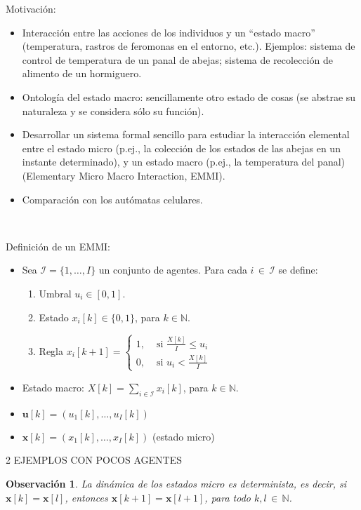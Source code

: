 \documentclass{article}
\newtheorem{obs}{Observación}
\begin{document}
Motivación: 
\begin{itemize}
\item Interacción entre las acciones de los individuos y un ``estado macro'' (temperatura, rastros de feromonas en el entorno, etc.). Ejemplos: sistema de control de temperatura de un panal de abejas; sistema de recolección de alimento de un hormiguero.
\item Ontología del estado macro: sencillamente otro estado de cosas (se abstrae su naturaleza y se considera sólo su función).
\item Desarrollar un sistema formal sencillo para  estudiar la interacción elemental entre el estado micro (p.ej., la colección de los estados de las abejas en un instante determinado), y un estado macro (p.ej., la temperatura del panal) (Elementary Micro Macro Interaction, EMMI). 
\item Comparación con los autómatas celulares.
\end{itemize}

\

Definición de un EMMI:
\begin{itemize}
\item Sea $\mathcal{I}=\{1,\ldots,I\}$ un conjunto de agentes. Para cada $i\,{\in}\,\mathcal{I}$ se define:
	\begin{enumerate}[label=(\alph*)]
	\item Umbral $u_i\in[0,1]$.
	\item Estado $x_i[k]\in\{0, 1\}$, para $k\in\mathbb{N}$.
	\item Regla  $x_i[k+1]=\begin{cases} 1, & \mbox{ si }\frac{X[k]}{I}\leq u_i\\ 0, & \mbox{ si } u_i < \frac{X[k]}{I}\end{cases}$
	\end{enumerate}

\item Estado macro: $X[k]=\sum_{i\in\mathcal{I}} x_i[k]$, para $k\in\mathbb{N}$.
\end{itemize}

\begin{itemize}
\item $\bm{u}[k]= (u_1[k],\ldots,u_I[k])$
\item $\bm{x}[k]= (x_1[k],\ldots,x_I[k])$ (estado micro)
\end{itemize}

\centerline{2 EJEMPLOS CON POCOS AGENTES}

\begin{obs}
La dinámica de los estados micro es determinista, es decir, si $\bm{x}[k]=\bm{x}[l]$, entonces $\bm{x}[k{+}1]=\bm{x}[l{+}1]$, para todo $k,l\,{\in}\,\mathbb{N}$.
\end{obs}
\end{document}

